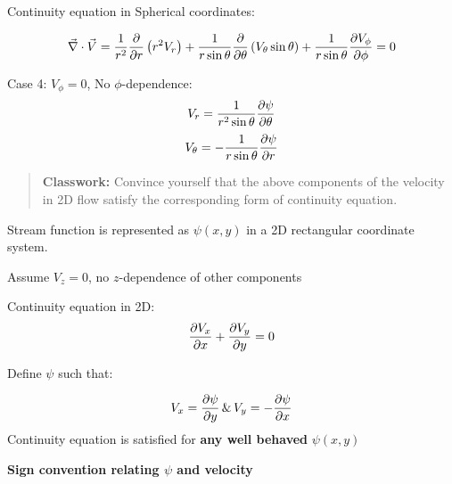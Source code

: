 Continuity equation in Spherical coordinates:

$$ \vec{\nabla} \cdot \vec{V} = {1 \over r^2} {\partial \over \partial r} \left( r^2 V_r \right) + {1 \over r \sin\theta} {\partial \over \partial \theta} \left( V_\theta \sin\theta \right) + {1 \over r \sin\theta} {\partial V_\phi \over \partial \phi} = 0 $$

Case 4: $V_\phi = 0$, No $\phi$-dependence:
 $$ V_r = {1 \over r^2 \sin\theta} {\partial \psi \over \partial \theta} $$
 $$ V_\theta = - {1 \over r \sin\theta} {\partial \psi \over \partial r} $$

\begin{quote}
{\bf Classwork:} Convince yourself that the above components of the velocity in 2D flow satisfy the corresponding form of continuity equation.
\end{quote}


Stream function is represented as $\psi\left(x,y\right)$ in a 2D rectangular coordinate system.

Assume $V_z = 0$, no $z$-dependence of other components

Continuity equation in 2D:
$${\partial V_x \over \partial x} + {\partial V_y \over \partial y} = 0$$

Define $\psi$ such that:

$$V_x = {\partial \psi \over \partial y} \, \& \, V_y = - {\partial \psi \over \partial x} $$
Continuity equation is satisfied for {\bf any well behaved} $\psi\left(x,y\right)$



{\bf Sign convention relating $\psi$ and velocity}


